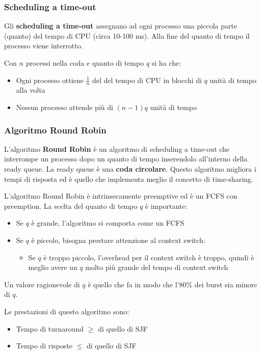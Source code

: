 \documentclass[a4paper]{article}
\begin{document}
\subsubsection{Scheduling a time-out}
Gli \textbf{scheduling a time-out} assegnano ad ogni processo una piccola parte (quanto)
del tempo di CPU (circa 10-100 ms). Alla fine del quanto di tempo il processo viene
interrotto.

\vspace{1em}
\noindent
Con \( n \) processi nella coda e quanto di tempo \( q \) si ha che:
\begin{itemize}
  \item Ogni processo ottiene \( \frac{1}{n} \) del del tempo di CPU in blocchi di
    \( q \) unità di tempo alla volta
  \item Nessun processo attende più di \( (n-1)q \) unità di tempo
\end{itemize}

\subsubsection{Algoritmo Round Robin}
L'algoritmo \textbf{Round Robin} è un algoritmo di scheduling a time-out che interrompe
un processo dopo un quanto di tempo inserendolo all'interno della ready queue. La ready
queue è una \textbf{coda circolare}. Questo algoritmo migliora i tempi di risposta ed
è quello che implementa meglio il concetto di time-sharing.

\vspace{1em}
\noindent
L'algoritmo Round Robin è intrinsecamente preemptive ed è un FCFS con preemption. La
scelta del quanto di tempo \( q \) è importante:
\begin{itemize}
  \item Se \( q \) è grande, l'algoritmo si comporta come un FCFS
  \item Se \( q \) è piccolo, bisogna prestare attenzione al context switch:
    \begin{itemize}
      \item Se \( q \) è troppo piccolo, l'overhead per il context switch è troppo,
        quindi è meglio avere un \( q \) molto più grande del tempo di context switch
    \end{itemize}
\end{itemize}
Un valore ragionevole di \( q \) è quello che fa in modo che l'80\% dei burst sia
minore di \( q \).

\vspace{1em}
\noindent
Le prestazioni di questo algoritmo sono:
\begin{itemize}
  \item Tempo di turnaround \( \ge  \) di quello di SJF
  \item Tempo di risposte \( \le  \) di quello di SJF
\end{itemize}
\end{document}
